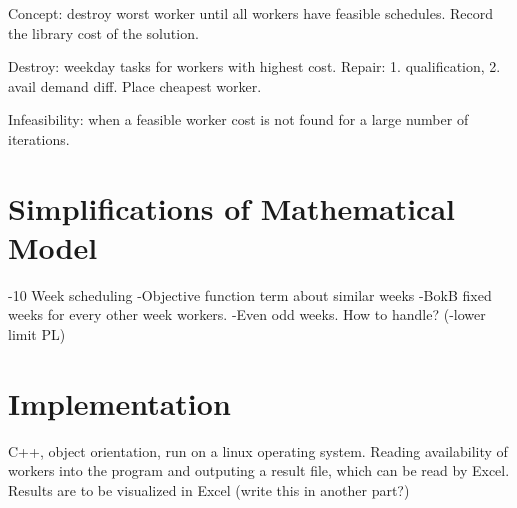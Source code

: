 Concept: destroy worst worker until all workers have feasible schedules. Record the library cost of the solution.

Destroy: weekday tasks for workers with highest cost.
Repair: 1. qualification, 2. avail demand diff. Place cheapest worker.

Infeasibility: when a feasible worker cost is not found for a large number of iterations.

\section{Simplifications of Mathematical Model}
-10 Week scheduling
-Objective function term about similar weeks
-BokB fixed weeks for every other week workers.
-Even odd weeks. How to handle?
(-lower limit PL)

\section{Implementation}
C++, object orientation, run on a linux operating system. Reading availability of workers into the program and outputing a result file, which can be read by Excel. Results are to be visualized in Excel (write this in another part?)